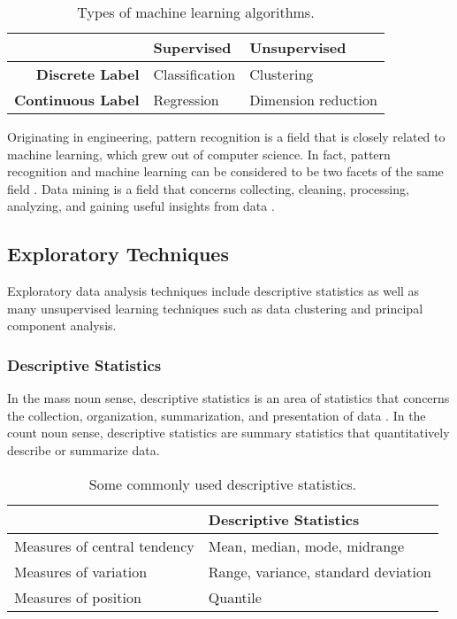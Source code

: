 \documentclass[12pt]{article}
\begin{document}
\begin{table}[htbp]
  \centering
  \caption{Types of machine learning algorithms.}
  \label{tbl:mlalg}%
    \begin{tabular}{rll}
    \toprule
          & \textbf{Supervised} & \textbf{Unsupervised} \\
    \midrule
    \textbf{Discrete Label} & Classification & Clustering \\
    \textbf{Continuous Label} & Regression & Dimension reduction \\
    \bottomrule
    \end{tabular}%
\end{table}%

Originating in engineering, pattern recognition is a field that is closely related to machine learning, which grew out of computer science. In fact, pattern recognition and machine learning can be considered to be two facets of the same field \citep{bishop2007}. Data mining is a field that concerns collecting, cleaning, processing, analyzing, and gaining useful insights from data \citep{aggarwal2015}.


\subsection{Exploratory Techniques}

Exploratory data analysis techniques include descriptive statistics as well as many unsupervised learning techniques such as data clustering and principal component analysis.

\subsubsection{Descriptive Statistics}

In the mass noun sense, descriptive statistics is an area of statistics that concerns the collection, organization, summarization, and presentation of data \citep{bluman2012}. In the count noun sense, descriptive statistics are summary statistics that quantitatively describe or summarize data.

\begin{table}[htbp]
\centering
\caption{Some commonly used descriptive statistics.}\label{tbl:desstat}
\begin{tabular}{ll}
\toprule
 & \textbf{Descriptive Statistics} \\
\midrule
Measures of central tendency & Mean, median, mode, midrange\\
Measures of variation & Range, variance, standard deviation \\
Measures of position & Quantile \\
\bottomrule
\end{tabular}
\end{table}
\end{document}
